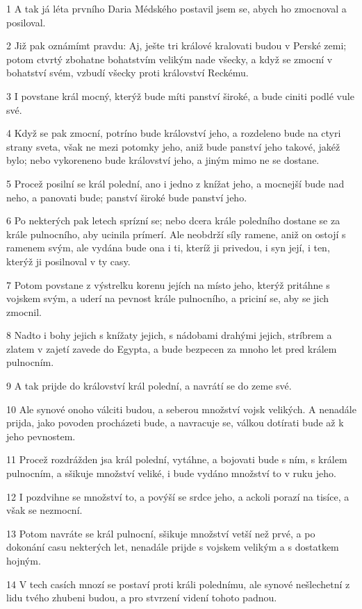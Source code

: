 \par 1 A tak já léta prvního Daria Médského postavil jsem se, abych ho zmocnoval a posiloval.
\par 2 Již pak oznámímt pravdu: Aj, ješte tri králové kralovati budou v Perské zemi; potom ctvrtý zbohatne bohatstvím velikým nade všecky, a když se zmocní v bohatství svém, vzbudí všecky proti království Reckému.
\par 3 I povstane král mocný, kterýž bude míti panství široké, a bude ciniti podlé vule své.
\par 4 Když se pak zmocní, potríno bude království jeho, a rozdeleno bude na ctyri strany sveta, však ne mezi potomky jeho, aniž bude panství jeho takové, jakéž bylo; nebo vykoreneno bude království jeho, a jiným mimo ne se dostane.
\par 5 Procež posilní se král polední, ano i jedno z knížat jeho, a mocnejší bude nad neho, a panovati bude; panství široké bude panství jeho.
\par 6 Po nekterých pak letech sprízní se; nebo dcera krále poledního dostane se za krále pulnocního, aby ucinila prímerí. Ale neobdrží síly ramene, aniž on ostojí s ramenem svým, ale vydána bude ona i ti, kteríž ji privedou, i syn její, i ten, kterýž ji posilnoval v ty casy.
\par 7 Potom povstane z výstrelku korenu jejích na místo jeho, kterýž pritáhne s vojskem svým, a uderí na pevnost krále pulnocního, a priciní se, aby se jich zmocnil.
\par 8 Nadto i bohy jejich s knížaty jejich, s nádobami drahými jejich, stríbrem a zlatem v zajetí zavede do Egypta, a bude bezpecen za mnoho let pred králem pulnocním.
\par 9 A tak prijde do království král polední, a navrátí se do zeme své.
\par 10 Ale synové onoho válciti budou, a seberou množství vojsk velikých. A nenadále prijda, jako povoden procházeti bude, a navracuje se, válkou dotírati bude až k jeho pevnostem.
\par 11 Procež rozdrážden jsa král polední, vytáhne, a bojovati bude s ním, s králem pulnocním, a sšikuje množství veliké, i bude vydáno množství to v ruku jeho.
\par 12 I pozdvihne se množství to, a povýší se srdce jeho, a ackoli porazí na tisíce, a však se nezmocní.
\par 13 Potom navráte se král pulnocní, sšikuje množství vetší než prvé, a po dokonání casu nekterých let, nenadále prijde s vojskem velikým a s dostatkem hojným.
\par 14 V tech casích mnozí se postaví proti králi polednímu, ale synové nešlechetní z lidu tvého zhubeni budou, a pro stvrzení videní tohoto padnou.
